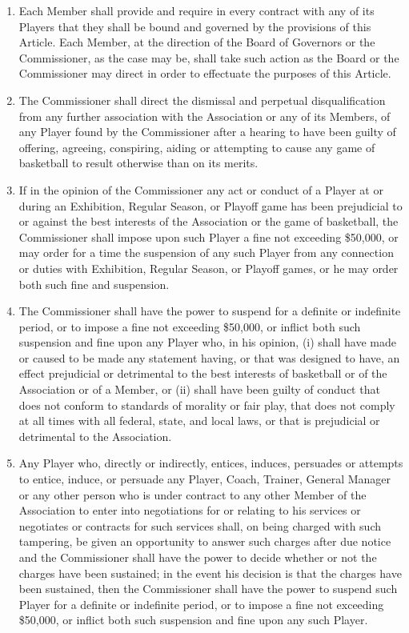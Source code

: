 \documentclass[
]{book}
\providecommand{\tightlist}{%
  \setlength{\itemsep}{0pt}\setlength{\parskip}{0pt}}
\begin{document}
\begin{enumerate}
  \begin{enumerate}
  \def\labelenumii{(\alph{enumii})}
  \tightlist
  \item
    Each Member shall provide and require in every contract with any of its Players that they shall be bound and governed by the provisions of this Article. Each Member, at the direction of the Board of Governors or the Commissioner, as the case may be, shall take such action as the Board or the Commissioner may direct in order to effectuate the purposes of this Article.
  \item
    The Commissioner shall direct the dismissal and perpetual disqualification from any further association with the Association or any of its Members, of any Player found by the Commissioner after a hearing to have been guilty of offering, agreeing, conspiring, aiding or attempting to cause any game of basketball to result otherwise than on its merits.
  \item
    If in the opinion of the Commissioner any act or conduct of a Player at or during an Exhibition, Regular Season, or Playoff game has been prejudicial to or against the best interests of the Association or the game of basketball, the Commissioner shall impose upon such Player a fine not exceeding \$50,000, or may order for a time the suspension of any such Player from any connection or duties with Exhibition, Regular Season, or Playoff games, or he may order both such fine and suspension.
  \item
    The Commissioner shall have the power to suspend for a definite or indefinite period, or to impose a fine not exceeding \$50,000, or inflict both such suspension and fine upon any Player who, in his opinion, (i) shall have made or caused to be made any statement having, or that was designed to have, an effect prejudicial or detrimental to the best interests of basketball or of the Association or of a Member, or (ii) shall have been guilty of conduct that does not conform to standards of morality or fair play, that does not comply at all times with all federal, state, and local laws, or that is prejudicial or detrimental to the Association.
  \item
    Any Player who, directly or indirectly, entices, induces, persuades or attempts to entice, induce, or persuade any Player, Coach, Trainer, General Manager or any other person who is under contract to any other Member of the Association to enter into negotiations for or relating to his services or negotiates or contracts for such services shall, on being charged with such tampering, be given an opportunity to answer such charges after due notice and the Commissioner shall have the power to decide whether or not the charges have been sustained; in the event his decision is that the charges have been sustained, then the Commissioner shall have the power to suspend such Player for a definite or indefinite period, or to impose a fine not exceeding \$50,000, or inflict both such suspension and fine upon any such Player.

\end{enumerate}
\end{enumerate}
\end{document}
